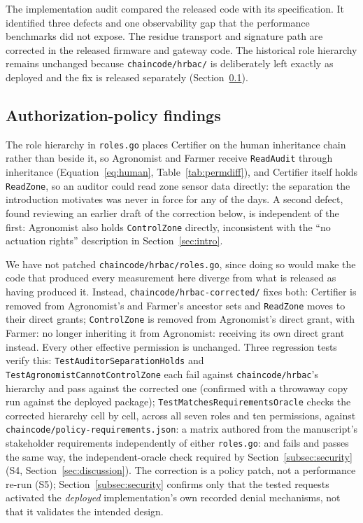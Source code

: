 \documentclass[a4paper,fleqn]{cas-dc}
\begin{document}
The implementation audit compared the released code with its specification.
It identified three defects and one observability gap that the performance
benchmarks did not expose. The residue transport and signature path are
corrected in the released firmware and gateway code. The historical role
hierarchy remains unchanged because
\texttt{chaincode/hrbac/} is deliberately left exactly as deployed and the
fix is released separately (Section~\ref{subsec:pm_policy}).

\subsection{Authorization-policy findings}
\label{subsec:pm_policy}

The role hierarchy in \texttt{roles.go} places Certifier on the human
inheritance chain rather than beside it, so Agronomist and Farmer receive
\texttt{ReadAudit} through inheritance (Equation~\eqref{eq:human},
Table~\ref{tab:permdiff}), and Certifier itself holds \texttt{ReadZone}, so
an auditor could read zone sensor data directly: the separation the
introduction motivates was never in force for any of the \DeployDays{}
days. A second defect, found reviewing an earlier draft of the correction
below, is independent of the first: Agronomist also holds
\texttt{ControlZone} directly, inconsistent with the ``no actuation
rights'' description in Section~\ref{sec:intro}.

We have not patched \texttt{chaincode/hrbac/roles.go}, since doing so
would make the code that produced every measurement here diverge from
what is released as having produced it. Instead,
\texttt{chaincode/hrbac-corrected/} fixes
both: Certifier is removed from Agronomist's and Farmer's ancestor sets
and \texttt{ReadZone} moves to their direct grants; \texttt{ControlZone}
is removed from Agronomist's direct grant, with Farmer: no longer
inheriting it from Agronomist: receiving its own direct grant instead.
Every other effective permission is unchanged. Three regression tests
verify this: \texttt{TestAuditorSeparationHolds} and
\texttt{TestAgronomistCannotControlZone} each fail against
\texttt{chaincode/hrbac}'s hierarchy and pass against the corrected one
(confirmed with a throwaway copy run against the deployed package);
\texttt{TestMatchesRequirementsOracle} checks the corrected hierarchy
cell by cell, across all seven roles and ten permissions, against
\texttt{chaincode/policy-requirements.json}: a matrix authored from the
manuscript's stakeholder requirements independently of either
\texttt{roles.go}: and fails and passes the same way, the
independent-oracle check required by Section~\ref{subsec:security}
(S4, Section~\ref{sec:discussion}). The correction is a policy patch,
not a performance re-run (S5); Section~\ref{subsec:security} confirms only
that the tested requests activated the \emph{deployed} implementation's
own recorded denial mechanisms, not that it validates the intended
design.
\end{document}
